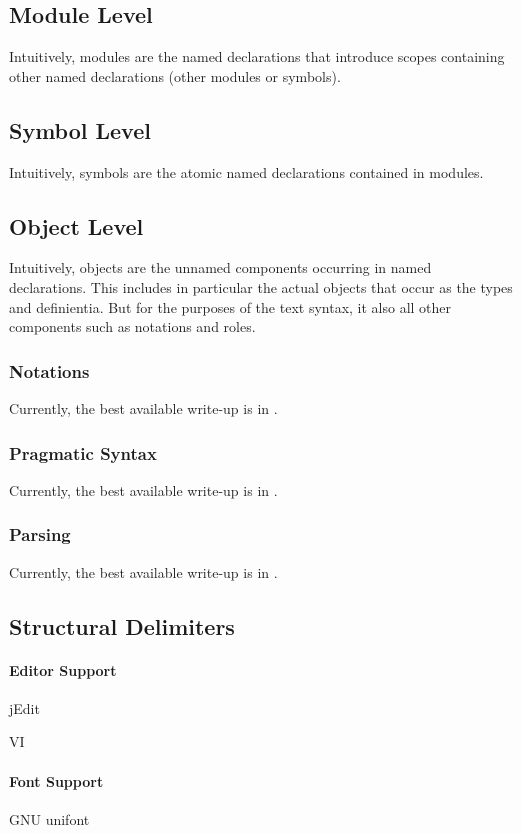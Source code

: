 \subsection{Module Level}

Intuitively, modules are the named declarations that introduce scopes containing other named declarations (other modules or symbols).

\subsection{Symbol Level}

Intuitively, symbols are the atomic named declarations contained in modules.

\subsection{Object Level}

Intuitively, objects are the unnamed components occurring in named declarations.
This includes in particular the actual {\mmt} objects that occur as the types and definientia.
But for the purposes of the text syntax, it also all other components such as notations and roles.

\subsubsection{Notations}

Currently, the best available write-up is in \cite{GIR:mmtlatex:13}.

\subsubsection{Pragmatic Syntax}

Currently, the best available write-up is in \cite{GIR:mmtlatex:13}.

\subsubsection{Parsing}

Currently, the best available write-up is in \cite{GIR:mmtlatex:13}.

\subsection{Structural Delimiters}

\paragraph{Editor Support}

jEdit

VI


\paragraph{Font Support}

GNU unifont